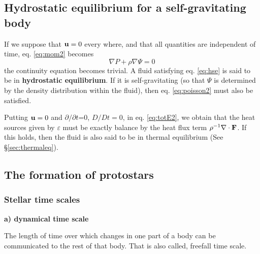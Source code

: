 \bigskip
\subsection{Hydrostatic equilibrium for a self-gravitating body}

If we suppose that ${\bf u}=0$ every where, and that all quantities are independent of time,
eq. \ref{eq:mom2} becomes
\begin{equation}\label{eq:hse}
  \nabla P + \rho \nabla \Psi = 0
\end{equation}
the continuity equation becomes trivial. A fluid satisfying eq. \ref{eq:hse} is said to
be in {\bf hydrostatic equilibrium}. If it is self-gravitating (so that $\Psi$ is determined
by the density distribution within the fluid), then eq. \ref{eq:poisson2} must also be satisfied.

Putting ${\bf u}=0$ and $\partial/\partial t$=0, \ie $D/Dt=0$, in eq. \ref{eq:totE2}, we obtain
that the heat sources given by $\varepsilon$ must be exactly balance by the heat flux term
$\rho^{-1}\nabla \cdot {\bf F}$. If this holds, then the fluid is also said to be in thermal
equilibrium (See \S \ref{sec:thermaleq}).

\bigskip
\subsection{The formation of protostars}

\subsubsection{Stellar time scales}

\textbf{a) dynamical time scale}

The length of time over which changes in one part of a body can be communicated to the rest of that body.
That is also called, freefall time scale.

